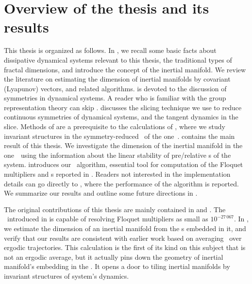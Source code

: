 

\section{Overview of the thesis and its results}

This thesis is organized as follows.
In , we recall some basic facts about dissipative
dynamical systems relevant to this thesis, the traditional types of fractal
dimensions, and introduce the concept of the inertial manifold.
We review the literature on estimating
the dimension of inertial manifolds by covariant
(Lyapunov) vectors, and related algorithms.
 is devoted to the discussion of symmetries in
dynamical systems. A reader who is familiar with the group representation
theory can skip .
 discusses the slicing technique we use to reduce
continuous symmetries of dynamical systems, and the tangent dynamics in the
slice.
Methods of  are a prerequisite to the calculations of
, where we study invariant structures in the
symmetry-reduced \statesp\ of the one\dmn\ \KSe.
 contains the main result of this thesis. We investigate the
dimension of the inertial manifold in the one\dmn\ \KSe\ using the
information about the linear stability of pre/relative \po s of the system.
 introduces our \ped\ algorithm, essential tool for
computation of the Floquet multipliers and \Fv s reported in
. Readers not interested in the implementation
details can go directly to , where the
performance of the algorithm is reported.
We summarize our results and outline some future directions in
.

The original contributions of this thesis are mainly contained in
 and . The \ped\ introduced
in  is capable of resolving Floquet
multipliers as small as $10^{-27\,067}$.
In , we estimate the dimension of an
inertial manifold from the \po s embedded in it, and verify that our results
are consistent with earlier work based on averaging \cLvs\ over ergodic
trajectories.
This calculation is the first of its kind on this subject that is not an ergodic
average, but it actually pins down the geometry of inertial manifold's
embedding in the \statesp. It opens a door to tiling inertial manifolds by
invariant structures of system's dynamics.
